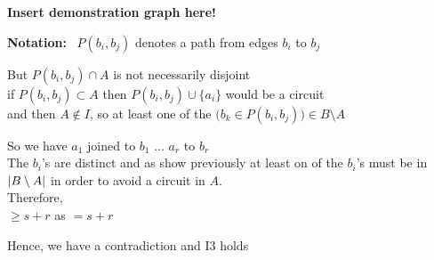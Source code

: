 \documentclass{article}
\theoremstyle{plain}
\theoremstyle{definition}
\theoremstyle{remark}
\newcommand\Notation{%
  \textbf{Notation:}~%
}
\begin{document}
 \textbf{Insert demonstration graph here!}
 
 \vspace{2mm}
 
 \noindent\Notation $ P ( b_i, b_j ) $ denotes a path from edges $ b_i $ to $ b_j $
 
 \vspace{2mm}
 
\noindent But $ P(b_i,b_j) \cap A $ is not necessarily disjoint\\
\noindent if $ P(b_i,b_j) \subset A  $ then $ P(b_i,b_j) \cup \{ a_i \} $  would be a circuit\\ and then $ A \notin I $, so at least one of the $ \big( b_k \in P(b_i,b_j) \big) \in B \setminus A $
 
 \vspace{4mm}
 
 \noindent So we have $ a_1 $ joined to $ b_1$ ... $ a_r $ to $ b_r $\\
 The $ b_i$'s are distinct and as show previously at least on of the $ b_i$'s must be in $ \abs{B \setminus A} $ in order to avoid a circuit in $ A $.\\ 
\noindent Therefore,\\ 
 \indent {} $ \geqslant s + r $ as  $ = s + r $ 
 
 \vspace{3mm}
 
\noindent Hence, we have a contradiction and I3 holds
 
\end{document}
